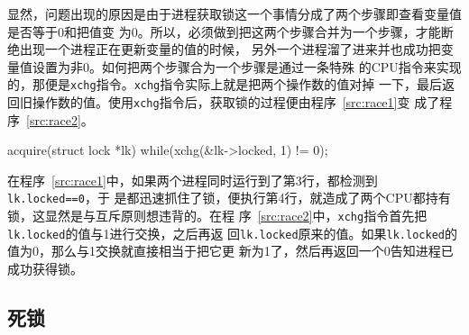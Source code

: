\documentclass{swfcthesismscctex}
\begin{document}
显然，问题出现的原因是由于进程获取锁这一个事情分成了两个步骤即查看变量值是否等于0和把值变
为0。所以，必须做到把这两个步骤合并为一个步骤，才能断绝出现一个进程正在更新变量的值的时候，
另外一个进程溜了进来并也成功把变量值设置为非0。如何把两个步骤合为一个步骤是通过一条特殊
的CPU指令来实现的，那便是\texttt{xchg}指令。\texttt{xchg}指令实际上就是把两个操作数的值对掉
一下，最后返回旧操作数的值。使用\texttt{xchg}指令后，获取锁的过程便由程序~\ref{src:race1}变
成了程序~\ref{src:race2}。

\begin{listing}[H]
  \begin{codeblock}
\begin{ccode}
acquire(struct lock *lk){
  while(xchg(&lk->locked, 1) != 0);
}
\end{ccode}
  \end{codeblock}
  \label{src:race2}
\end{listing}

在程序~\ref{src:race1}中，如果两个进程同时运行到了第3行，都检测到\texttt{lk.locked==0}，于
是都迅速抓住了锁，便执行第4行，就造成了两个CPU都持有锁，这显然是与互斥原则想违背的。在程
序~\ref{src:race2}中，\texttt{xchg}指令首先把\texttt{lk.locked}的值与1进行交换，之后再返
回\texttt{lk.locked}原来的值。如果\texttt{lk.locked}的值为0，那么与1交换就直接相当于把它更
新为1了，然后再返回一个0告知进程已成功获得锁。



\subsection{死锁}
\end{document}
